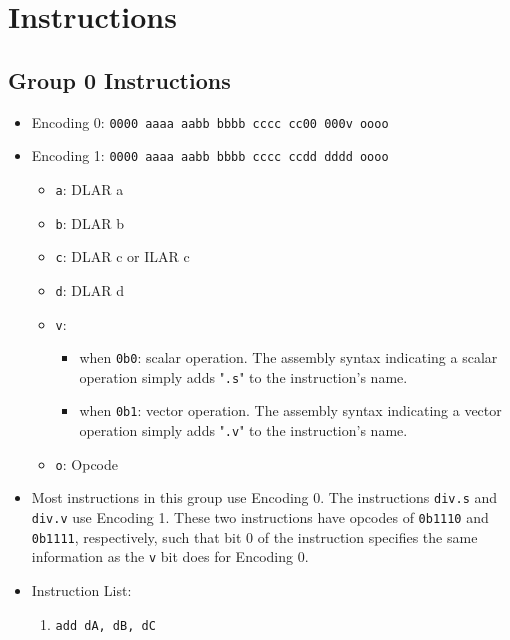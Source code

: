 \documentclass{article}
\begin{document}
\section{Instructions}
	\subsection{Group 0 Instructions}
		\begin{itemize}
		\item Encoding 0: \texttt{0000 aaaa aabb bbbb  cccc cc00 000v oooo}
		\item Encoding 1: \texttt{0000 aaaa aabb bbbb  cccc ccdd dddd oooo}
			\begin{itemize}
			\item \texttt{a}: DLAR a
			\item \texttt{b}: DLAR b
			\item \texttt{c}: DLAR c or ILAR c
			\item \texttt{d}: DLAR d
			\item \texttt{v}:
				\begin{itemize}
				\item when \texttt{0b0}: scalar operation. The assembly
					syntax indicating a scalar operation simply adds
					"\texttt{.s}" to the instruction's name.
				\item when \texttt{0b1}: vector operation. The assembly
					syntax indicating a vector operation simply adds
					"\texttt{.v}" to the instruction's name.
				\end{itemize}
			\item \texttt{o}: Opcode
			\end{itemize}
		\item Most instructions in this group use Encoding 0.
			The instructions \texttt{div.s} and \texttt{div.v} use Encoding
			1. These two instructions have opcodes of \texttt{0b1110} and
			\texttt{0b1111}, respectively, such that bit 0 of the
			instruction specifies the same information as the \texttt{v}
			bit does for Encoding 0.
		\item Instruction List:
			\begin{enumerate}
			\item \texttt{add dA, dB, dC}

\end{enumerate}
\end{itemize}
\end{document}
